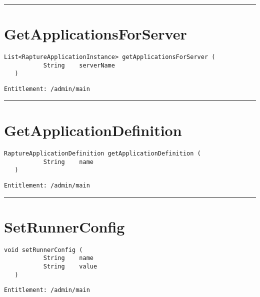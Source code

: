 \rule{12cm}{2pt}
\section{GetApplicationsForServer}
\label{Api:GetApplicationsForServer}
\begin{lstlisting}[style=nonumbers]
   List<RaptureApplicationInstance> getApplicationsForServer (
           String    serverName
   )
\end{lstlisting}
\begin{Verbatim}[formatcom=\color{Maroon}]
  Entitlement: /admin/main
\end{Verbatim}



\rule{12cm}{2pt}
\section{GetApplicationDefinition}
\label{Api:GetApplicationDefinition}
\begin{lstlisting}[style=nonumbers]
   RaptureApplicationDefinition getApplicationDefinition (
           String    name
   )
\end{lstlisting}
\begin{Verbatim}[formatcom=\color{Maroon}]
  Entitlement: /admin/main
\end{Verbatim}



\rule{12cm}{2pt}
\section{SetRunnerConfig}
\label{Api:SetRunnerConfig}
\begin{lstlisting}[style=nonumbers]
   void setRunnerConfig (
           String    name
           String    value
   )
\end{lstlisting}
\begin{Verbatim}[formatcom=\color{Maroon}]
  Entitlement: /admin/main
\end{Verbatim}



